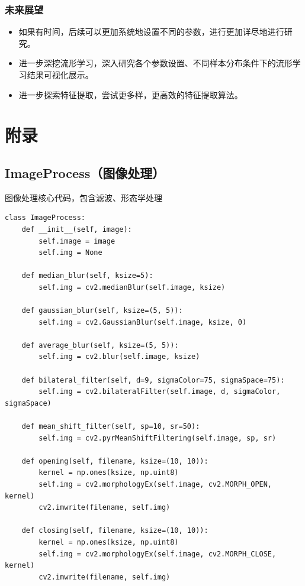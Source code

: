 \documentclass[12pt,hyperref,a4paper,UTF8]{ctexart}
\begin{document}
{{\subsubsection{未来展望}
\begin{itemize}
    \item 如果有时间，后续可以更加系统地设置不同的参数，进行更加详尽地进行研究。
    \item 进一步深挖流形学习，深入研究各个参数设置、不同样本分布条件下的流形学习结果可视化展示。
    \item 进一步探索特征提取，尝试更多样，更高效的特征提取算法。
\end{itemize}

\section{附录}
\subsection{ImageProcess（图像处理）}
图像处理核心代码，包含滤波、形态学处理
\begin{mdframed}[style=codebox]
\begin{lstlisting}
class ImageProcess:
    def __init__(self, image):
        self.image = image
        self.img = None

    def median_blur(self, ksize=5):
        self.img = cv2.medianBlur(self.image, ksize)

    def gaussian_blur(self, ksize=(5, 5)):
        self.img = cv2.GaussianBlur(self.image, ksize, 0)

    def average_blur(self, ksize=(5, 5)):
        self.img = cv2.blur(self.image, ksize)

    def bilateral_filter(self, d=9, sigmaColor=75, sigmaSpace=75):
        self.img = cv2.bilateralFilter(self.image, d, sigmaColor, sigmaSpace)

    def mean_shift_filter(self, sp=10, sr=50):
        self.img = cv2.pyrMeanShiftFiltering(self.image, sp, sr)

    def opening(self, filename, ksize=(10, 10)):
        kernel = np.ones(ksize, np.uint8)
        self.img = cv2.morphologyEx(self.image, cv2.MORPH_OPEN, kernel)
        cv2.imwrite(filename, self.img)

    def closing(self, filename, ksize=(10, 10)):
        kernel = np.ones(ksize, np.uint8)
        self.img = cv2.morphologyEx(self.image, cv2.MORPH_CLOSE, kernel)
        cv2.imwrite(filename, self.img)


\end{lstlisting}
\end{mdframed}}}
\end{document}
